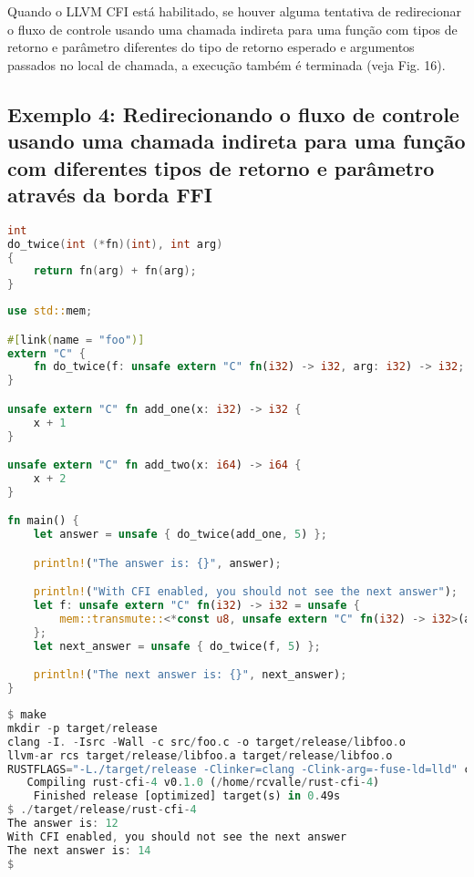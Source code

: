 \documentclass{article}
\begin{document}
Quando o LLVM CFI está habilitado, se houver alguma tentativa de redirecionar o fluxo de controle usando uma chamada indireta para uma função com tipos de retorno e parâmetro diferentes do tipo de retorno esperado e argumentos passados no local de chamada, a execução também é terminada (veja Fig. 16).


\subsection{Exemplo 4: Redirecionando o fluxo de controle usando uma chamada indireta para uma função com diferentes tipos de retorno e parâmetro através da borda FFI}

\begin{lstlisting}[language=C, caption={Exemplo de biblioteca C.}]
int
do_twice(int (*fn)(int), int arg)
{
    return fn(arg) + fn(arg);
}
\end{lstlisting}

\begin{lstlisting}[language=Rust, caption={Redirecionando o fluxo de controle usando uma chamada indireta para uma função com tipos de retorno e de parâmetro diferentes do tipo de retorno esperado e argumentos passados no local de chamada, através da borda FFI}]
use std::mem;

#[link(name = "foo")]
extern "C" {
    fn do_twice(f: unsafe extern "C" fn(i32) -> i32, arg: i32) -> i32;
}

unsafe extern "C" fn add_one(x: i32) -> i32 {
    x + 1
}

unsafe extern "C" fn add_two(x: i64) -> i64 {
    x + 2
}

fn main() {
    let answer = unsafe { do_twice(add_one, 5) };

    println!("The answer is: {}", answer);

    println!("With CFI enabled, you should not see the next answer");
    let f: unsafe extern "C" fn(i32) -> i32 = unsafe {
        mem::transmute::<*const u8, unsafe extern "C" fn(i32) -> i32>(add_two as *const u8)
    };
    let next_answer = unsafe { do_twice(f, 5) };

    println!("The next answer is: {}", next_answer);
}
\end{lstlisting}

\begin{lstlisting}[language=Rust, caption={Compilação e execução das Figs. 17–18 com LLVM CFI desabilitado.}]
$ make
mkdir -p target/release
clang -I. -Isrc -Wall -c src/foo.c -o target/release/libfoo.o
llvm-ar rcs target/release/libfoo.a target/release/libfoo.o
RUSTFLAGS="-L./target/release -Clinker=clang -Clink-arg=-fuse-ld=lld" cargo build --release
   Compiling rust-cfi-4 v0.1.0 (/home/rcvalle/rust-cfi-4)
    Finished release [optimized] target(s) in 0.49s
$ ./target/release/rust-cfi-4
The answer is: 12
With CFI enabled, you should not see the next answer
The next answer is: 14
$
\end{lstlisting}
\end{document}
